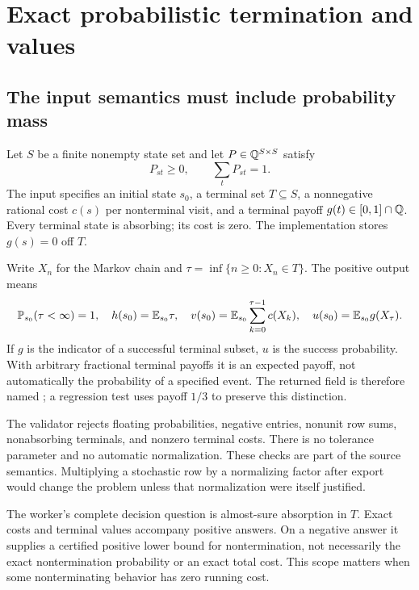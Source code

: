 \section{Exact probabilistic termination and values}
\label{sec:markov}


\subsection{The input semantics must include probability mass}
Let $S$ be a finite nonempty state set and let
$P\in\mathbb{Q}^{S\times S}$ satisfy
\[
 P_{st}\geq0,\qquad \sum_tP_{st}=1.
\]
The input specifies an initial state $s_0$, a terminal set $T\subseteq S$, a
nonnegative rational cost $c(s)$ per nonterminal visit, and a terminal payoff
$g(t)\in[0,1]\cap\mathbb{Q}$. Every terminal state is absorbing; its cost is zero.
The implementation stores $g(s)=0$ off $T$.

Write $X_n$ for the Markov chain and
$\tau=\inf\{n\geq0:X_n\in T\}$. The positive output means
\begin{equation}
 \mathbb{P}_{s_0}(\tau<\infty)=1,
 \quad h(s_0)=\mathbb{E}_{s_0}\tau,
 \quad v(s_0)=\mathbb{E}_{s_0}\sum_{k=0}^{\tau-1}c(X_k),
 \quad u(s_0)=\mathbb{E}_{s_0}g(X_\tau).
 \label{eq:mc-goals}
\end{equation}
If $g$ is the indicator of a successful terminal subset, $u$ is the success
probability. With arbitrary fractional terminal payoffs it is an expected
payoff, not automatically the probability of a specified event. The returned
field is therefore named ; a regression test
uses payoff $1/3$ to preserve this distinction.

The validator rejects floating probabilities, negative entries, nonunit row
sums, nonabsorbing terminals, and nonzero terminal costs. There is no tolerance
parameter and no automatic normalization. These checks are part of the source
semantics. Multiplying a stochastic row by a normalizing factor after export
would change the problem unless that normalization were itself justified.

The worker's complete decision question is almost-sure absorption in $T$.
Exact costs and terminal values accompany positive answers. On a negative
answer it supplies a certified positive lower bound for nontermination, not
necessarily the exact nontermination probability or an exact total cost.
This scope matters when some nonterminating behavior has zero running cost.

